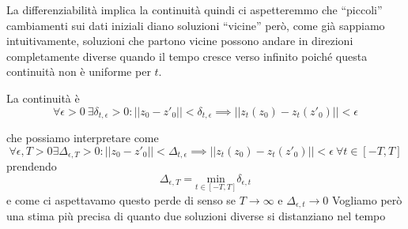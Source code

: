 \documentclass[11pt,a4paper,twoside]{book}
\theoremstyle{esss}
\theoremstyle{dotless}
\numberwithin{equation}{section} %
\begin{document}
La differenziabilità implica la continuità quindi ci aspetteremmo che ``piccoli'' cambiamenti sui dati iniziali diano soluzioni ``vicine'' però, come già sappiamo intuitivamente, soluzioni che partono vicine possono andare in direzioni completamente diverse quando il tempo cresce verso infinito poiché questa continuità non è uniforme per $t$.

La continuità è
\[
\forall \epsilon>0 \> \exists \delta_{t,\epsilon}>0 : \left|\left| z_0-z'_0\right|\right| <\delta_{t,\epsilon} \implies \left|\left| z_t(z_0)-z_t(z'_0) \right|\right|<\epsilon   
\]

che possiamo interpretare come
\[
\forall\epsilon,T>0 \exists \Delta_{\epsilon,T}>0 : \left|\left| z_0-z'_0\right|\right| <\Delta_{t,\epsilon} \implies \left|\left| z_t(z_0)-z_t(z'_0) \right|\right|<\epsilon \> \forall t\in[-T,T]
\]
prendendo 
\[\Delta_{\epsilon,T}=\underset{t\in[-T,T]}{\text{min}}{\delta_{\epsilon,t}}\]
e come ci aspettavamo questo perde di senso se $T\rightarrow\infty$ e $\Delta_{\epsilon,t}\rightarrow 0$
Vogliamo però una stima più precisa di quanto due soluzioni diverse si distanziano nel tempo
\end{document}
